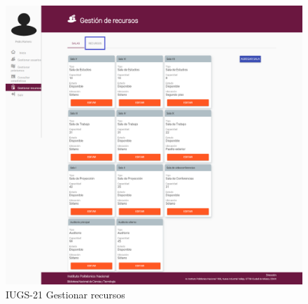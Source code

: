 \begin{enumerate}
			\begin{figure}[hbtp]	
				\centering
					\includegraphics[scale=0.3]{images/Interfaz/IUGS21_GestionarRecursosR.png}
			\caption{IUGS-21 Gestionar recursos}
			\end{figure}
			
			
	\end{enumerate}

	